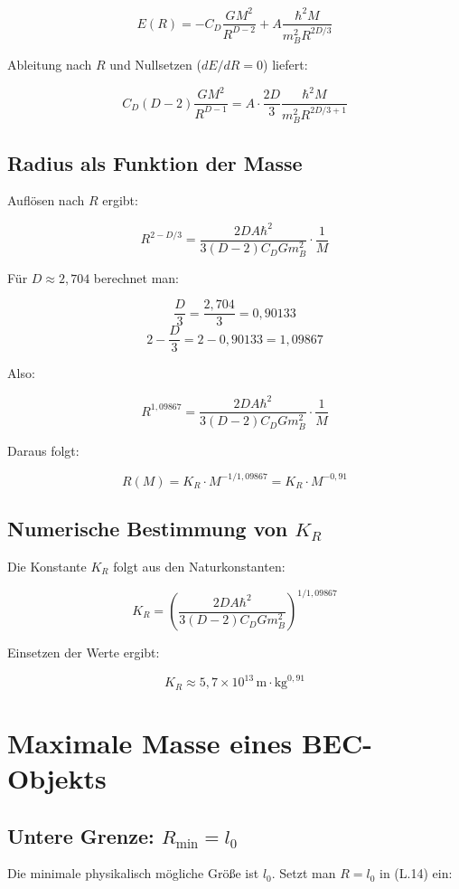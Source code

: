 \[
E(R) = -C_D \frac{GM^2}{R^{D-2}} + A \frac{\hbar^2 M}{m_B^2 R^{2D/3}} \tag{L.11}
\]

Ableitung nach \( R \) und Nullsetzen (\( dE/dR = 0 \)) liefert:

\[
C_D (D-2) \frac{GM^2}{R^{D-1}} = A \cdot \frac{2D}{3} \frac{\hbar^2 M}{m_B^2 R^{2D/3 + 1}} \tag{L.12}
\]

\subsection{Radius als Funktion der Masse}

Auflösen nach \( R \) ergibt:

\[
R^{2 - D/3} = \frac{2D A \hbar^2}{3(D-2) C_D G m_B^2} \cdot \frac{1}{M} \tag{L.13}
\]

Für \( D \approx 2,704 \) berechnet man:

\[
\frac{D}{3} = \frac{2,704}{3} = 0,90133
\]
\[
2 - \frac{D}{3} = 2 - 0,90133 = 1,09867
\]

Also:

\[
R^{1,09867} = \frac{2D A \hbar^2}{3(D-2) C_D G m_B^2} \cdot \frac{1}{M}
\]

Daraus folgt:

\[
R(M) = K_R \cdot M^{-1/1,09867} = K_R \cdot M^{-0,91} \tag{L.14}
\]

\subsection{Numerische Bestimmung von \( K_R \)}

Die Konstante \( K_R \) folgt aus den Naturkonstanten:

\[
K_R = \left( \frac{2D A \hbar^2}{3(D-2) C_D G m_B^2} \right)^{1/1,09867} \tag{L.15}
\]

Einsetzen der Werte ergibt:

\[
K_R \approx 5,7 \times 10^{13} \, \text{m} \cdot \text{kg}^{0,91} \tag{L.16}
\]

\section{Maximale Masse eines BEC-Objekts}

\subsection{Untere Grenze: \( R_{\min} = l_0 \)}

Die minimale physikalisch mögliche Größe ist \( l_0 \). 
Setzt man \( R = l_0 \) in (L.14) ein:

